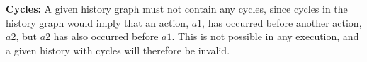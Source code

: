 	\textbf{Cycles:} A given history graph must not contain any cycles, since cycles in the history graph would imply that an action, $a1$, has occurred before another action, $a2$, but $a2$ has also occurred before $a1$. This is not possible in any execution, and a given history with cycles will therefore be invalid.
	
	
	
	
	

